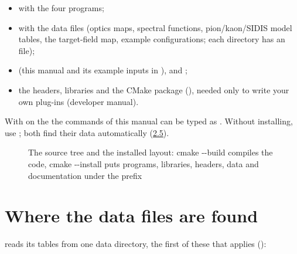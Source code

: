\begin{itemize}
\item {} with the four programs;
\item {} with the data files (optics maps, spectral functions, pion/\allowbreak{}kaon/\allowbreak{}SIDIS model tables, the
target-field map, example configurations; each directory has an  file);
\item {} (this manual and its example inputs in ),
 and ;
\item the headers, libraries and the CMake package  (), needed only to write your own plug-ins
(developer manual).
\end{itemize}
With  on the  the commands of this manual can be typed as . Without installing, use
; both find their data automatically (\hyperref[user_manual-02u5finstallation:25-where-the-data-files-are-found]{2.5}).

\begin{figure}[htbp]
\caption[The source tree and the installed layout]{The source tree and the installed layout: cmake -{}-build compiles the code, cmake -{}-install puts programs, libraries, headers, data and documentation under the prefix}\label{fig:sourceu5flayout}
\end{figure}
\section{\texorpdfstring{Where the data files are found}{Where the data files are found}}\label{user_manual-02u5finstallation:25-where-the-data-files-are-found}
 reads its tables from one data directory, the first of these that applies ():

